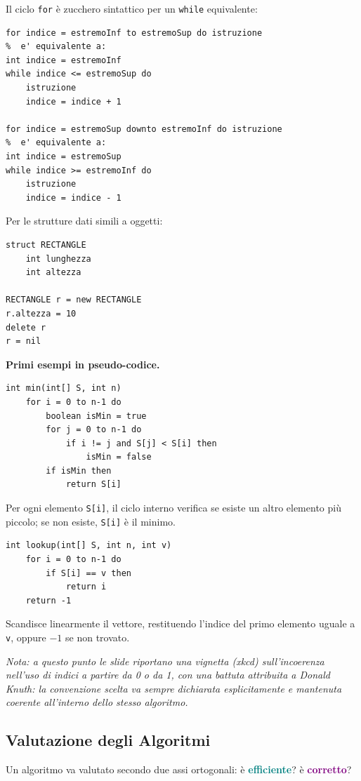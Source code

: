 \documentclass[12pt, a4paper]{article}
\begin{document}
Il ciclo \texttt{for} è zucchero sintattico per un \texttt{while} equivalente:
\begin{verbatim}
for indice = estremoInf to estremoSup do istruzione
%  e' equivalente a:
int indice = estremoInf
while indice <= estremoSup do
    istruzione
    indice = indice + 1

for indice = estremoSup downto estremoInf do istruzione
%  e' equivalente a:
int indice = estremoSup
while indice >= estremoInf do
    istruzione
    indice = indice - 1
\end{verbatim}

Per le strutture dati simili a oggetti:
\begin{verbatim}
struct RECTANGLE
    int lunghezza
    int altezza

RECTANGLE r = new RECTANGLE
r.altezza = 10
delete r
r = nil
\end{verbatim}

\textbf{Primi esempi in pseudo-codice.}
\begin{verbatim}
int min(int[] S, int n)
    for i = 0 to n-1 do
        boolean isMin = true
        for j = 0 to n-1 do
            if i != j and S[j] < S[i] then
                isMin = false
        if isMin then
            return S[i]
\end{verbatim}
Per ogni elemento \texttt{S[i]}, il ciclo interno verifica se esiste un altro elemento più piccolo; se non esiste, \texttt{S[i]} è il minimo.

\begin{verbatim}
int lookup(int[] S, int n, int v)
    for i = 0 to n-1 do
        if S[i] == v then
            return i
    return -1
\end{verbatim}
Scandisce linearmente il vettore, restituendo l'indice del primo elemento uguale a \texttt{v}, oppure $-1$ se non trovato.

\textit{Nota: a questo punto le slide riportano una vignetta (xkcd) sull'incoerenza nell'uso di indici a partire da 0 o da 1, con una battuta attribuita a Donald Knuth: la convenzione scelta va sempre dichiarata esplicitamente e mantenuta coerente all'interno dello stesso algoritmo.}

\subsection{Valutazione degli Algoritmi}

Un algoritmo va valutato secondo due assi ortogonali: è \textcolor{teal}{\textbf{efficiente}}? è \textcolor{purple}{\textbf{corretto}}?
\end{document}

